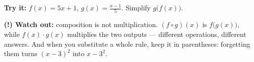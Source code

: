 \documentclass[12pt]{article}
\begin{document}
\begin{tryitbox}
\textbf{Try it:} \quad $f(x) = 5x + 1$, $g(x) = \frac{x-1}{5}$. Simplify
$g\big(f(x)\big)$.\\[2pt]
\end{tryitbox}

\begin{watchoutbox}
\textbf{(!) Watch out:} composition is not multiplication.
$(f \circ g)(x)$ is $f\big(g(x)\big)$, while $f(x) \cdot g(x)$ multiplies the
two outputs --- different operations, different answers. And when you
substitute a whole rule, keep it in parentheses: forgetting them turns
$(x-3)^2$ into $x - 3^2$.
\end{watchoutbox}
\end{document}
